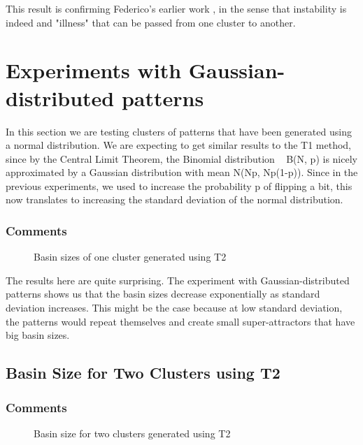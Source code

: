 This result is confirming Federico's earlier work \cite{federico}, in the sense that instability is indeed and "illness" that can be passed from one cluster to another.


\section{Experiments with Gaussian-distributed patterns}

In this section we are testing clusters of patterns that have been generated using a normal distribution. We are expecting to get similar results to the T1 method, since by the Central Limit Theorem, the Binomial distribution ~ B(N, p) is nicely approximated by a Gaussian distribution with mean N(Np, Np(1-p)). Since in the previous experiments, we used to increase the probability p of flipping a bit, this now translates to increasing the standard deviation of the normal distribution.


\subsubsection{Comments}

\begin{figure}[h]
  \centering
  
\caption{Basin sizes of one cluster generated using T2}
\label{fig:plot-T2-onecluster}
\end{figure}

The results here are quite surprising. The experiment with Gaussian-distributed patterns shows us that the basin sizes decrease exponentially as standard deviation increases. This might be the case because at low standard deviation, the patterns would repeat themselves and create small super-attractors that have big basin sizes.


\subsection{Basin Size for Two Clusters using T2}

\subsubsection{Comments}

\begin{figure}[h]
  \centering
  
\caption{Basin size for two clusters generated using T2}
\label{fig:plot-T2-twocluster}
\end{figure}

